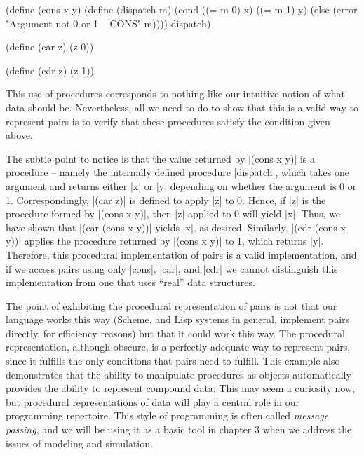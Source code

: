 \begin{schemedisplay}
(define (cons x y)
  (define (dispatch m)
    (cond ((= m 0) x)
          ((= m 1) y)
          (else (error "Argument not 0 or 1 -- CONS" m))))
  dispatch)

(define (car z) (z 0))

(define (cdr z) (z 1))
\end{schemedisplay}
This use of procedures corresponds to nothing like our intuitive
notion of what data should be.  Nevertheless, all we need to do to
show that this is a valid way to represent pairs is to verify that
these procedures satisfy the condition given above.

The subtle point to notice is that the value returned by \scheme|(cons
x y)| is a procedure -- namely the internally defined procedure
\scheme|dispatch|, which takes one argument and returns either
\scheme|x| or \scheme|y| depending on whether the argument is 0 or 1.
Correspondingly, \scheme|(car z)| is defined to apply \scheme|z| to 0.
Hence, if \scheme|z| is the procedure formed by \scheme|(cons x y)|,
then \scheme|z| applied to 0 will yield \scheme|x|. Thus, we have
shown that \scheme|(car (cons x y))| yields \scheme|x|, as desired.
Similarly, \scheme|(cdr (cons x y))| applies the procedure returned by
\scheme|(cons x y)| to 1, which returns \scheme|y|.  Therefore, this
procedural implementation of pairs is a valid implementation, and if
we access pairs using only \scheme|cons|, \scheme|car|, and
\scheme|cdr| we cannot distinguish this implementation from one that
uses ``real'' data structures.

The point of exhibiting the procedural representation of pairs is not
that our language works this way (Scheme, and Lisp systems in general,
implement pairs directly, for efficiency reasons) but that it could
work this way.  The procedural representation, although obscure, is a
perfectly adequate way to represent pairs, since it fulfills the only
conditions that pairs need to fulfill.  This example also demonstrates
that the ability to manipulate procedures as objects automatically
provides the ability to represent compound data.  This may seem a
curiosity now, but procedural representations of data will play a
central role in our programming repertoire.  This style of programming
is often called \textit{message passing}, and we will be using it as a
basic tool in chapter 3 when we address the issues of modeling and
simulation.


